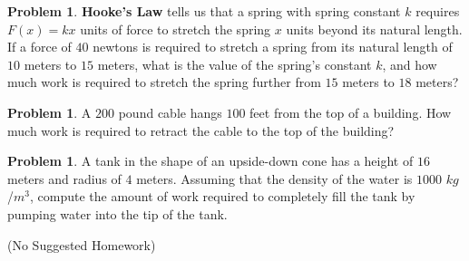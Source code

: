 \documentclass[letterpaper, twoside, 12pt]{book}
\theoremstyle{definition}
\theoremstyle{definition}
\newtheorem{goal}[theorem]{Goal}
\newtheorem{problem}[theorem]{Problem}
\begin{document}
\vfill

\begin{problem}
  \textbf{Hooke's Law} tells us that a spring with spring constant $k$ requires
  $F(x)=kx$ units of force to stretch the spring $x$ units beyond its natural
  length. If a force of $40$ newtons is required to stretch a spring from
  its natural length of $10$ meters to $15$ meters, what is the value of the
  spring's constant $k$, and how much
  work is required to stretch the spring further from $15$ meters to
  $18$ meters?
\end{problem}

\vfill

\newpage

\begin{problem}
  A $200$ pound cable hangs $100$ feet from the top of a building. How much
  work is required to retract the cable to the top of the building?
\end{problem}

\vfill

\begin{problem}
  A tank in the shape of an upside-down cone has a height of $16$ meters and
  radius of $4$ meters. Assuming that the density of the water is $1000$
  $kg$/$m^3$, compute the amount of work required to completely fill the tank
  by pumping water into the tip of the tank.
\end{problem}

\vfill

(No Suggested Homework)





\end{document}
